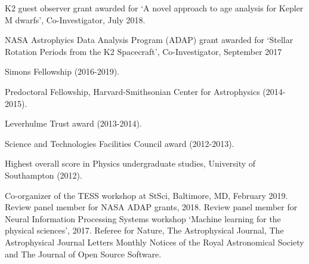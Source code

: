 \documentclass[12pt,letterpaper]{article}
\begin{document}
\begin{list}{}{\cvlist}
\item
    K2 guest observer grant awarded for `A novel approach to age analysis for
    Kepler M dwarfs', Co-Investigator, July 2018.
\item
    NASA Astrophyics Data Analysis Program (ADAP) grant awarded for
    `Stellar Rotation Periods from the K2 Spacecraft', Co-Investigator,
    September 2017
\item
Simons Fellowship (2016-2019).
\item
Predoctoral Fellowship, Harvard-Smithsonian Center for Astrophysics
(2014-2015).
\item
Leverhulme Trust award (2013-2014).
\item
Science and Technologies Facilities Council award (2012-2013).
\item
Highest overall score in Physics undergraduate studies, University of
Southampton (2012).
\end{list}

\begin{list}{}{\cvlist}
\item
    Co-organizer of the TESS workshop at StSci, Baltimore, MD, February 2019.
    Review panel member for NASA ADAP grants, 2018.
    Review panel member for Neural Information Processing Systems workshop
    `Machine learning for the physical sciences', 2017.
    Referee for Nature, The Astrophysical
    Journal, The Astrophysical Journal Letters Monthly Notices of the
    Royal Astronomical Society and The Journal of Open Source Software.
\end{list}

\end{document}
